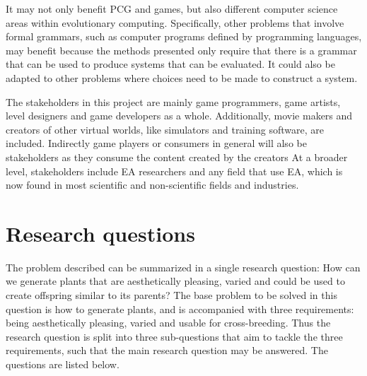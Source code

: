 It may not only benefit \gls{PCG} and games, but also different computer science areas within evolutionary computing.
Specifically, other problems that involve formal grammars, such as computer programs defined by programming languages, may benefit because the methods presented only require that there is a grammar that can be used to produce systems that can be evaluated.
It could also be adapted to other problems where choices need to be made to construct a system.

The stakeholders in this project are mainly game programmers, game artists, level designers and game developers as a whole.
Additionally, movie makers and creators of other virtual worlds, like simulators and training software, are included.
Indirectly game players or consumers in general will also be stakeholders as they consume the content created by the creators
At a broader level, stakeholders include \gls{EA} researchers and any field that use \gls{EA}, which is now found in most scientific and non-scientific fields and industries. %

\section{Research questions}
The problem described can be summarized in a single research question: How can we generate plants that are aesthetically pleasing, varied and could be used to create offspring similar to its parents?
The base problem to be solved in this question is how to generate plants, and is accompanied with three requirements: being aesthetically pleasing, varied and usable for cross-breeding.
Thus the research question is split into three sub-questions that aim to tackle the three requirements, such that the main research question may be answered.
The questions are listed below.


